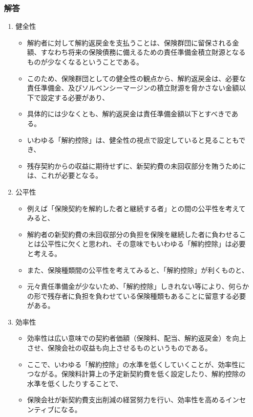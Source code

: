\documentclass[report,gutter=10mm,fore-edge=10mm,uplatex,dvipdfmx]{jlreq}
\begin{document}
\subsubsection{解答}
  \begin{enumerate}
    \item 健全性
    \begin{itemize}
      \item 解約者に対して解約返戻金を支払うことは、保険群団に留保される金額、すなわち将来の保険債務に備えるための責任準備金積立財源となるものが少なくなるということである。
      \item このため、保険群団としての健全性の観点から、解約返戻金は、必要な責任準備金、及びソルベンシーマージンの積立財源を脅かさない金額以下で設定する必要があり、
      \item 具体的には少なくとも、解約返戻金は責任準備金額以下とすべきである。
      \item いわゆる「解約控除」は、健全性の視点で設定していると見ることもでき、
      \item 残存契約からの収益に期待せずに、新契約費の未回収部分を賄うためには、これが必要となる。
    \end{itemize}
    \item 公平性
    \begin{itemize}
      \item 例えば「保険契約を解約した者と継続する者」との間の公平性を考えてみると、
      \item 解約者の新契約費の未回収部分の負担を保険を継続した者に負わせることは公平性に欠くと思われ、その意味でもいわゆる「解約控除」は必要と考える。
      \item また、保険種類間の公平性を考えてみると、「解約控除」が利くものと、
      \item 元々責任準備金が少ないため、「解約控除」しきれない等により、何らかの形で残存者に負担を負わせている保険種類もあることに留意する必要がある。
    \end{itemize}
    \item 効率性
    \begin{itemize}
      \item 効率性は広い意味での契約者価額（保険料、配当、解約返戻金）を向上させ、保険会社の収益も向上させるものというものである。
      \item ここで、いわゆる「解約控除」の水準を低くしていくことが、効率性につながる。保険料計算上の予定新契約費を低く設定したり、解約控除の水準を低くしたりすることで、
      \item 保険会社が新契約費支出削減の経営努力を行い、効率性を高めるインセンティブになる。

\end{itemize}
\end{enumerate}
\end{document}
